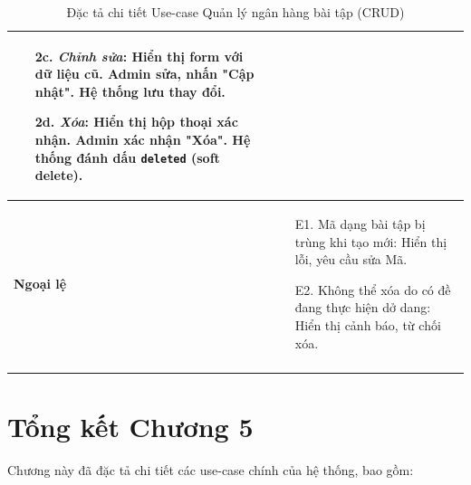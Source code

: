 \begin{longtable}{|p{}|p{}|}
\begin{enumerate}[topsep=2pt, itemsep=0pt]
    \item[2c.] \textit{Chỉnh sửa}: Hiển thị form với dữ liệu cũ. Admin sửa, nhấn "Cập nhật". Hệ thống lưu thay đổi.
    \item[2d.] \textit{Xóa}: Hiển thị hộp thoại xác nhận. Admin xác nhận "Xóa". Hệ thống đánh dấu \texttt{deleted} (soft delete).
\end{enumerate} \\
\hline
\textbf{Ngoại lệ} &
\vspace{-\baselineskip}
\begin{enumerate}[topsep=2pt, itemsep=0pt]
    \item[E1.] Mã dạng bài tập bị trùng khi tạo mới: Hiển thị lỗi, yêu cầu sửa Mã.
    \item[E2.] Không thể xóa do có đề đang thực hiện dở dang: Hiển thị cảnh báo, từ chối xóa.
\end{enumerate} \\
\hline
\caption{Đặc tả chi tiết Use-case Quản lý ngân hàng bài tập (CRUD)}
\label{table:uc-crud}
\end{longtable}

\clearpage

\section{Tổng kết Chương 5}

Chương này đã đặc tả chi tiết các use-case chính của hệ thống, bao gồm:

